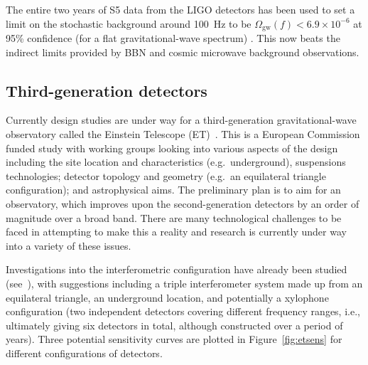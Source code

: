 The entire two years of S5 data from the LIGO detectors has been used to set a
limit on the stochastic background around 100~Hz to be $\Omega_{\mathrm{gw}}(f) <
6.9\times10^{-6}$ at 95\% confidence (for a flat gravitational-wave spectrum)
\cite{Abbott:2009b}. This now beats the indirect limits provided by BBN and cosmic microwave background observations.


\subsection{Third-generation detectors}
\label{subsec:et} 

Currently design studies are under way for a third-generation gravitational-wave
observatory called the Einstein Telescope (ET)~\cite{ETweb}. This is a European
Commission funded study with working groups looking into various aspects of the
design including the site location and characteristics (e.g.\, underground),
suspensions technologies; detector topology and geometry (e.g.\, an equilateral
triangle configuration); and astrophysical aims. The preliminary plan is to
aim for an observatory, which improves upon the second-generation detectors by
an order of magnitude over a broad band. There are many technological challenges
to be faced in attempting to make this a reality and research is currently under
way into a variety of these issues.


Investigations into the interferometric configuration have already been studied
(see~\cite{Freise:2008, Hild:2008, Hild:2010}), with suggestions including a
triple interferometer system made up from an equilateral triangle, an
underground location, and potentially a xylophone configuration (two independent
detectors covering different frequency ranges, i.e., ultimately giving six
detectors in total, although constructed over a period of years). Three
potential sensitivity curves are plotted in Figure~\ref{fig:etsens} for different
configurations of detectors.
